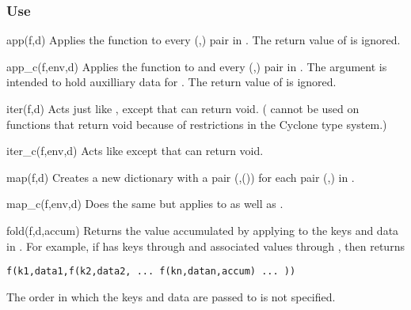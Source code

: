 \subsubsection*{Use}

\begin{defun}{app}{(f,d)}
Applies the function  to every (,) pair in
.  The return value of  is ignored.
\end{defun}

\begin{defun}{app_c}{(f,env,d)}
Applies the function  to  and every
(,) pair in .  The argument  is
intended to hold auxilliary data for .  The return value of
 is ignored.
\end{defun}

\begin{defun}{iter}{(f,d)}
Acts just like , except that  can return void.
( cannot be used on functions that return void because of
restrictions in the Cyclone type system.)
\end{defun}

\begin{defun}{iter_c}{(f,env,d)}
Acts like  except that  can return void.
\end{defun}

\begin{defun}{map}{(f,d)}
Creates a new dictionary with a pair (,()) for
each pair (,) in .
\end{defun}

\begin{defun}{map_c}{(f,env,d)}
Does the same but applies  to  as well as .
\end{defun}


\begin{defun}{fold}{(f,d,accum)}
Returns the value accumulated by applying  to the keys and data
in .  For example, if  has keys  through 
and associated values  through , then 
returns

\begin{verbatim}
f(k1,data1,f(k2,data2, ... f(kn,datan,accum) ... ))
\end{verbatim}

\noindent The order in which the keys and data are passed to  is
not specified.
\end{defun}

